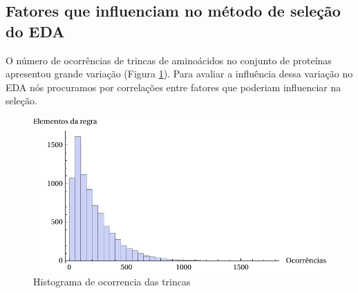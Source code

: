 





\subsection{Fatores que influenciam no método de seleção do EDA}

O número de ocorrências de trincas de aminoácidos no conjunto de proteínas apresentou grande variação (Figura \ref{fig:histograma_occ}). Para avaliar a influência dessa variação no EDA nós procuramos por correlações entre fatores que poderiam influenciar na seleção.

\begin{figure}
  \centering
  \includegraphics[width=1\textwidth]{figures/histograma_occ.pdf}
  \caption{Histograma de ocorrencia das trincas}
        \label{fig:histograma_occ}
\end{figure}

